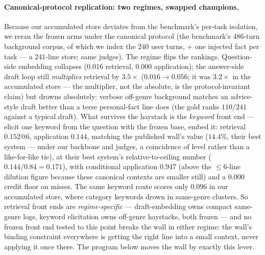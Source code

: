 \documentclass[11pt]{article}
\begin{document}
\paragraph{Canonical-protocol replication: two regimes, swapped champions.} Because our
accumulated store deviates from the benchmark's per-task isolation, we reran the frozen arms
under the canonical protocol (the benchmark's 486-turn background corpus, of which we index
the $240$ user turns, $+$ one injected fact per task --- a $241$-line store; same judges). The regime flips the rankings. Question-side embedding collapses ($0.016$ retrieval,
$0.000$ application); the answer-side draft loop still \emph{multiplies} retrieval by
$3.5\times$ ($0.016 \to 0.056$; it was $3.2\times$ in the accumulated store --- the
multiplier, not the absolute, is the protocol-invariant claim) but drowns absolutely: verbose
off-genre background matches an advice-style draft better than a terse personal-fact line does
(the gold ranks $110/241$ against a typical draft). What survives the haystack is the
\emph{keyword} front end --- elicit one keyword from the question with the frozen base, embed
it: retrieval $0.152$@6, application $\mathbf{0.144}$, matching the published wall's value
($14.4\%$, their best system --- under our backbone and judges, a coincidence of level
rather than a like-for-like tie), at their best system's relative-to-ceiling number
($0.144/0.84 = 0.171$), with conditional application $0.947$ (above the $\le6$-line
dilution figure because these canonical contexts are smaller still) and a $0.000$ credit floor on
misses. The same keyword route scores only $0.096$ in our accumulated store, where category
keywords drown in same-genre clusters. So retrieval front ends are \emph{regime-specific} ---
draft-embedding owns compact same-genre logs, keyword elicitation owns off-genre haystacks,
both frozen --- and no frozen front end tested to this point breaks the wall in either
regime: the wall's binding constraint everywhere is getting the right line into a small
context, never applying it once there. The program below moves the wall by exactly this
lever.
\end{document}
